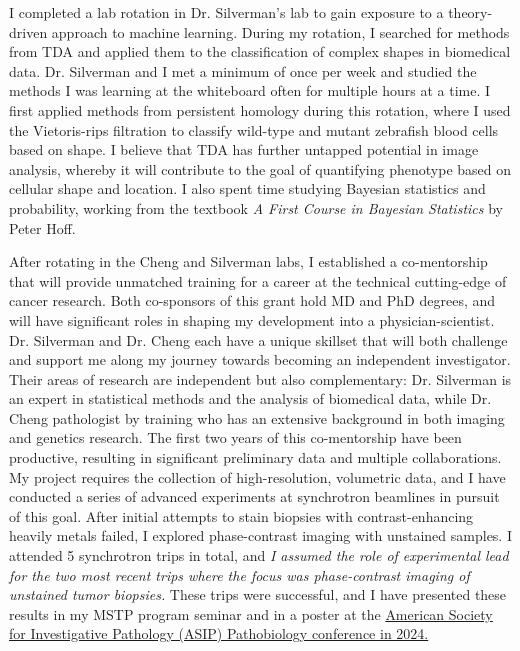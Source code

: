 \documentclass{NIHGrant}
\begin{document}
I completed a lab rotation in Dr. Silverman's lab to gain exposure to a theory-driven approach to machine learning. During my rotation, I searched for methods from TDA and applied them to the classification of complex shapes in biomedical data. Dr. Silverman and I met a minimum of once per week and studied the methods I was learning at the whiteboard often for multiple hours at a time. I first applied methods from persistent homology during this rotation, where I used the Vietoris-rips filtration to classify wild-type and mutant zebrafish blood cells based on shape. I believe that TDA has further untapped potential in image analysis, whereby it will contribute to the goal of quantifying phenotype based on cellular shape and location. I also spent time studying Bayesian statistics and probability, working from the textbook \textit{A First Course in Bayesian Statistics} by Peter Hoff.

After rotating in the Cheng and Silverman labs, I established a co-mentorship that will provide unmatched training for a career at the technical cutting-edge of cancer research. {Both co-sponsors of this grant hold MD and PhD degrees, and will have significant roles in shaping my development into a physician-scientist.} Dr. Silverman and Dr. Cheng each have a unique skillset that will both challenge and support me along my journey towards becoming an independent investigator. Their areas of research are independent but also complementary: Dr. Silverman is an expert in statistical methods and the analysis of biomedical data, while Dr. Cheng pathologist by training who has an extensive background in both imaging and genetics research. The first two years of this co-mentorship have been productive, resulting in significant preliminary data and multiple collaborations. My project requires the collection of high-resolution, volumetric data, and I have conducted a series of advanced experiments at synchrotron beamlines in pursuit of this goal. After initial attempts to stain biopsies with contrast-enhancing heavily metals failed, I explored phase-contrast imaging with unstained samples. I attended 5 synchrotron trips in total, and \emph{I assumed the role of experimental lead for the two most recent trips where the focus was phase-contrast imaging of unstained tumor biopsies.} These trips were successful, and I have presented these results in my MSTP program seminar and in a poster at the \uline{American Society for Investigative Pathology (ASIP) Pathobiology conference in 2024.}
\end{document}
